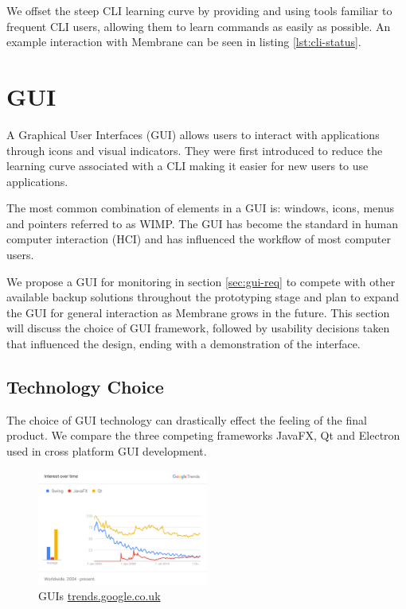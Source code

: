 \documentclass[11pt, a4paper, twocolumn, twoside]{report}
\begin{document}
We offset the steep CLI learning curve by providing and using tools familiar to frequent CLI users, allowing them to learn commands as easily as possible. An example interaction with Membrane can be seen in listing \ref{lst:cli-status}.

\section{GUI}

A Graphical User Interfaces (GUI) allows users to interact with applications through icons and visual indicators. They were first introduced to reduce the learning curve associated with a CLI \citep{linfo2004gui} making it easier for new users to use applications.

The most common combination of elements in a GUI is: windows, icons, menus and pointers referred to as WIMP. \citep{van1997post} The GUI has become the standard in human computer interaction (HCI) and has influenced the workflow of most computer users.

We propose a GUI for monitoring in section \ref{sec:gui-req} to compete with other available backup solutions throughout the prototyping stage and plan to expand the GUI for general interaction as Membrane grows in the future. This section will discuss the choice of GUI framework, followed by usability decisions taken that influenced the design, ending with a demonstration of the interface.

\subsection{Technology Choice}

The choice of GUI technology can drastically effect the feeling of the final product. We compare the three competing frameworks JavaFX, Qt and Electron used in cross platform GUI development.

\begin{figure}[h]
 \centering
 \includegraphics[width=0.5\textwidth]{gui-trends}
 \caption{GUIs \url{trends.google.co.uk}}
 \label{fig:gui-trends}
\end{figure}
\end{document}
